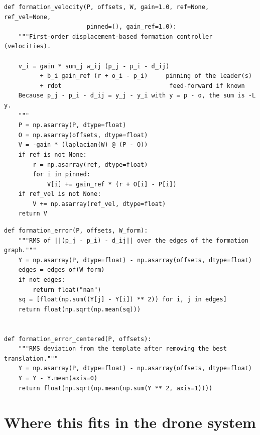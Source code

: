 \begin{lstlisting}[caption={The first-order displacement-based formation controller with leader pinning and feed-forward: \cref{alg:ch23-formation} for the whole swarm at once, using $\pos_j - \pos_i - \vect{d}_{ij} = \vect{y}_j - \vect{y}_i$ (from \code{code/ch23\_consensus.py}).},label={lst:ch23-velocity}]
def formation_velocity(P, offsets, W, gain=1.0, ref=None, ref_vel=None,
                       pinned=(), gain_ref=1.0):
    """First-order displacement-based formation controller (velocities).

    v_i = gain * sum_j w_ij (p_j - p_i - d_ij)
          + b_i gain_ref (r + o_i - p_i)     pinning of the leader(s)
          + rdot                              feed-forward if known
    Because p_j - p_i - d_ij = y_j - y_i with y = p - o, the sum is -L y.
    """
    P = np.asarray(P, dtype=float)
    O = np.asarray(offsets, dtype=float)
    V = -gain * (laplacian(W) @ (P - O))
    if ref is not None:
        r = np.asarray(ref, dtype=float)
        for i in pinned:
            V[i] += gain_ref * (r + O[i] - P[i])
    if ref_vel is not None:
        V += np.asarray(ref_vel, dtype=float)
    return V
\end{lstlisting}

\begin{lstlisting}[caption={The formation error of \cref{def:ch23-error} over the edges of the formation graph, and its centered variant (from \code{code/ch23\_consensus.py}).},label={lst:ch23-error}]
def formation_error(P, offsets, W_form):
    """RMS of ||(p_j - p_i) - d_ij|| over the edges of the formation graph."""
    Y = np.asarray(P, dtype=float) - np.asarray(offsets, dtype=float)
    edges = edges_of(W_form)
    if not edges:
        return float("nan")
    sq = [float(np.sum((Y[j] - Y[i]) ** 2)) for i, j in edges]
    return float(np.sqrt(np.mean(sq)))


def formation_error_centered(P, offsets):
    """RMS deviation from the template after removing the best translation."""
    Y = np.asarray(P, dtype=float) - np.asarray(offsets, dtype=float)
    Y = Y - Y.mean(axis=0)
    return float(np.sqrt(np.mean(np.sum(Y ** 2, axis=1))))
\end{lstlisting}

\section{Where this fits in the drone system}
\label{sec:ch23-drone}

